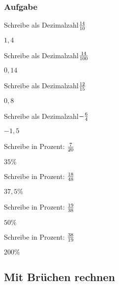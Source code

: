 \documentclass[
  ngerman,
]{book}
\begin{document}
\hypertarget{section-3}{%
\subsubsection*{}\label{section-3}}

\hypertarget{aufgabe-1}{%
\subsubsection*{Aufgabe}\label{aufgabe-1}}

Schreibe als Dezimalzahl\(14 \over 10\)

\leavevmode\hypertarget{toggleText9}{}%
\(1,4\)

Schreibe als Dezimalzahl\(14 \over 100\)

\leavevmode\hypertarget{toggleText10}{}%
\(0,14\)

Schreibe als Dezimalzahl\(12 \over 15\)

\leavevmode\hypertarget{toggleText11}{}%
\(0,8\)

Schreibe als Dezimalzahl\(-{6 \over 4}\)

\leavevmode\hypertarget{toggleText12}{}%
\(-1,5\)

Schreibe in Prozent: \(7 \over 20\)

\leavevmode\hypertarget{toggleText13}{}%
\(35\%\)

Schreibe in Prozent: \(18 \over 48\)

\leavevmode\hypertarget{toggleText14}{}%
\(37,5\%\)

Schreibe in Prozent: \(19 \over 38\)

\leavevmode\hypertarget{toggleText15}{}%
\(50\%\)

Schreibe in Prozent: \(38 \over 19\)

\leavevmode\hypertarget{toggleText16}{}%
\(200\%\)

\hypertarget{section-4}{%
\subsubsection*{}\label{section-4}}

\hypertarget{section-5}{%
\subsubsection*{}\label{section-5}}

\hypertarget{mit-bruxfcchen-rechnen}{%
\subsection*{Mit Brüchen rechnen}\label{mit-bruxfcchen-rechnen}}
\end{document}
